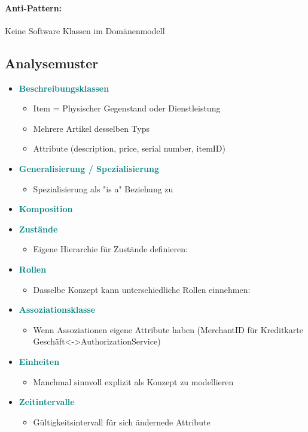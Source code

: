 \documentclass[../ZF_SWEN1.tex]{subfiles}
\begin{document}
\paragraph {Anti-Pattern:}
Keine Software Klassen im Domänenmodell 


\subsection{Analysemuster}
\begin{itemize}
	\item \textcolor {teal} {\textbf{Beschreibungsklassen}}
	\begin{itemize}
		\item Item = Physischer Gegenstand oder Dienstleistung
		\item Mehrere Artikel desselben Typs
		\item Attribute (description, price, serial number, itemID)
	\end{itemize}
	\item \textcolor {teal} {\textbf{Generalisierung / Spezialisierung}}
	\begin{itemize}
		\item Spezialisierung als "is a" Beziehung zu 
					
	\end{itemize}
	\item \textcolor {teal}{\textbf{Komposition}}
	\item \textcolor {teal} {\textbf{Zustände}}
		\begin{itemize}
			\item Eigene Hierarchie für Zustände definieren: 
		\end{itemize}
	\item \textcolor {teal} {\textbf{Rollen}}
	\begin{itemize}
		\item Dasselbe Konzept kann unterschiedliche Rollen einnehmen: 
	\end{itemize}
	\item \textcolor {teal} {\textbf{Assoziationsklasse}}
	\begin{itemize}
		\item Wenn Assoziationen eigene Attribute haben (MerchantID für Kreditkarte Geschäft<->AuthorizationService)
	\end{itemize}
	\item \textcolor {teal} {\textbf{Einheiten}}
	\begin{itemize}
		\item Manchmal sinnvoll explizit als Konzept zu modellieren  
	\end{itemize}
	\item \textcolor {teal} {\textbf{Zeitintervalle}}
	\begin{itemize}
		\item Gültigkeitsintervall für sich ändernede Attribute   
	\end{itemize}
\end{itemize}
\end{document}
